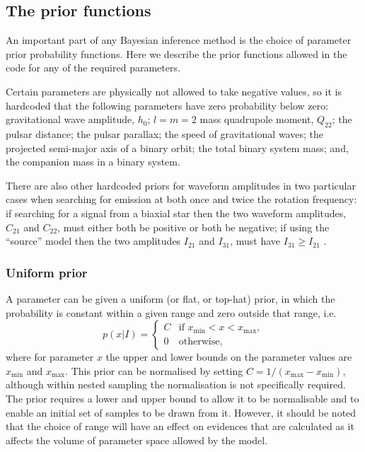 \subsection{The prior functions}\label{sec:priorfuncs}

An important part of any Bayesian inference method is the choice of parameter prior probability functions. Here we describe the prior
functions allowed in the code for any of the required parameters.

Certain parameters are physically not allowed to take negative values, so it is hardcoded that the following parameters
have zero probability below zero: gravitational wave amplitude, $h_0$; $l=m=2$ mass quadrupole moment, $Q_{22}$; the pulsar
distance; the pulsar parallax; the speed of gravitational waves; the projected semi-major axis of a binary orbit; the total
binary system mass; and, the companion mass in a binary system.

There are also other hardcoded priors for waveform amplitudes in two particular cases when searching for emission at both once
and twice the rotation frequency: if searching for a signal from a biaxial star then the two waveform amplitudes, $C_{21}$ and $C_{22}$,
must either both be positive or both be negative; if using the ``source'' model then the two amplitudes $I_{21}$ and $I_{31}$, must
have $I_{31} \geqslant I_{21}$ \citep[see, e.g.,][]{2015MNRAS.453.4399P}.

\subsubsection{Uniform prior}\label{sec:uniformprior}

A parameter can be given a uniform (or flat, or top-hat) prior, in which the probability is constant within a given
range and zero outside that range, i.e.
\begin{equation}
p(x|I) = \begin{cases}
             C & \text{if } x_{\text{min}} < x < x_{\text{max}}, \\
             0 & \text{otherwise},
            \end{cases}
\end{equation}
where for parameter $x$ the upper and lower bounds on the parameter values are $x_{\text{min}}$ and $x_{\text{max}}$. This
prior can be normalised by setting $C = 1/(x_{\text{max}}-x_{\text{min}})$, although within nested sampling the normalisation
is not specifically required. The prior requires a lower and upper bound to allow it to be normalisable and to enable
an initial set of samples to be drawn from it. However, it should be noted that the choice of range will have an
effect on evidences that are calculated as it affects the volume of parameter space allowed by the model.

